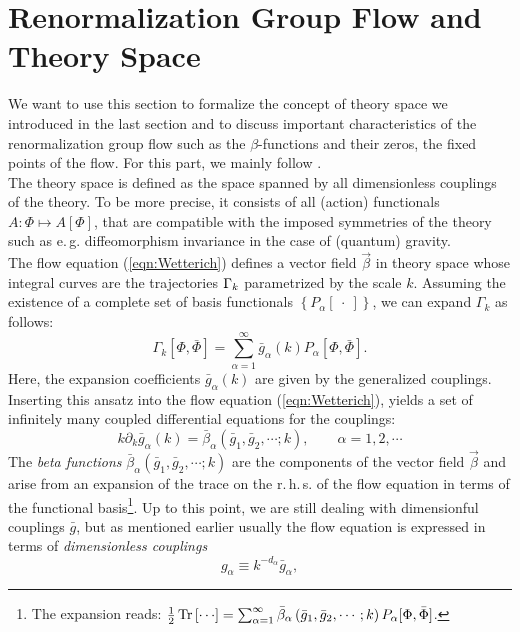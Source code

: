 \section{Renormalization Group Flow and Theory Space}
We want to use this section to formalize the concept of theory space we introduced in the last section and to discuss important characteristics of the renormalization group flow such as the $\beta$-functions and their zeros, the fixed points of the flow. For this part, we mainly follow \cite{ReuterSaueressig2012}. \\
The theory space is defined as the space spanned by all dimensionless couplings of the theory. To be more precise, it consists of all (action) functionals $A:\Phi \mapsto A[\Phi]$, that are compatible with the imposed symmetries of the theory such as e.\,g. diffeomorphism invariance in the case of (quantum) gravity. \\
The flow equation (\ref{eqn:Wetterich}) defines a vector field $\vec{\beta}$ in theory space whose integral curves are the trajectories $\Gamma_{k}$ parametrized by the scale $k$. Assuming the existence of a complete set of basis functionals $\left\{P_{\alpha}[\ \cdot \ ]\right\}$, we can expand $\Gamma_k$ as follows:
\begin{equation}
	\Gamma_{k}[\Phi, \bar{\Phi}]=\sum_{\alpha=1}^{\infty} \bar{g}_{\alpha}(k) P_{\alpha}[\Phi, \bar{\Phi}].
\end{equation}
Here, the expansion coefficients $ \bar{g}_{\alpha}(k)$ are given by the generalized couplings. Inserting this ansatz into the flow equation (\ref{eqn:Wetterich}), yields a set of infinitely many coupled differential equations for the couplings:
\begin{equation}
	k \partial_{k} \bar{g}_{\alpha}(k)=\bar{\beta}_{\alpha}\left(\bar{g}_{1}, \bar{g}_{2}, \cdots ; k\right), \qquad \alpha=1,2, \cdots
\end{equation}
The \textit{beta functions} $\bar{\beta}_{\alpha}\left(\bar{g}_{1}, \bar{g}_{2}, \cdots ; k\right)$  are the components of the vector field $\vec{\beta}$ and arise from an expansion of the trace on the r.\,h.\,s. of the flow equation in terms of the functional basis\footnote{The expansion reads: $\frac{1}{2}\tr{\cdots} = \sum_{\alpha=1}^{\infty} \bar{\beta}_{\alpha}\left(\bar{g}_{1}, \bar{g}_{2}, \cdots ; k\right) P_{\alpha}[\Phi, \bar{\Phi}]$.}. Up to this point, we are still dealing with dimensionful couplings $\bar{g}$, but as mentioned earlier usually the flow equation is expressed in terms of \textit{dimensionless couplings}
\begin{equation}
	g_{\alpha} \equiv k^{-d_{\alpha}} \bar{g}_{\alpha},
\end{equation}
